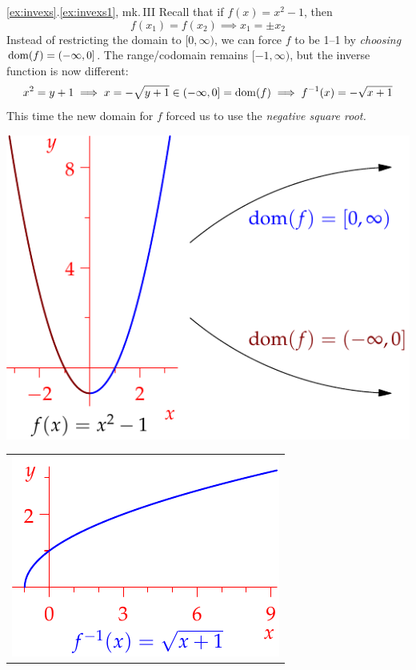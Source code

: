 \begin{example*}{\ref*{ex:invexs}.\ref{ex:invexs1}, mk.\,III}{}
Recall that if $f(x)=x^2-1$, then
\[f(x_1)=f(x_2)\implies x_1=\pm x_2\]
Instead of restricting the domain to $[0,\infty)$, we can force $f$ to be 1--1 by \emph{choosing} $\operatorname{dom}(f)=(-\infty,0]$. The range/codomain remains $[-1,\infty)$, but the inverse function is now different:
\[x^2=y+1\implies x=-\sqrt{y+1}\in (-\infty,0]=\operatorname{dom}(f) \implies f^{-1}(x)=-\sqrt{x+1}\]
This time the new domain for $f$ forced us to use the \emph{negative square root.}
\begin{center}
\begin{minipage}[t]{0.52\linewidth}\vspace{30pt}
	\centering\includegraphics{inverses-combi}
\end{minipage}\begin{minipage}[t]{0.35\linewidth}\vspace{0pt}
	\centering\begin{tabular}{@{}c@{}}
		\includegraphics{inverses-combi2}\\[25pt]

\end{tabular}
\end{minipage}
\end{center}
\end{example*}
